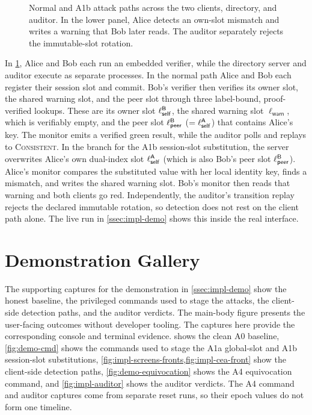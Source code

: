 \begin{figure}[p]
\centering

\caption[Normal and A1b attack paths across the four roles.]{Normal and A1b attack paths across
the two clients, directory, and auditor. In the lower panel, Alice detects an own-slot mismatch and
writes a warning that Bob later reads. The auditor separately rejects the immutable-slot rotation.}
\label{fig:impl-e2e}
\end{figure}

\FloatBarrier
In \cref{fig:impl-e2e}, Alice and Bob each run an embedded verifier, while the directory server and auditor
execute as separate processes. In the normal path Alice and Bob each register their session slot and
commit. Bob's verifier
then verifies its owner slot, the shared warning slot, and the peer slot through three
label-bound, proof-verified lookups. These are its owner slot $\ell^{\mathsf{B}}_{\mathsf{self}}$, the shared warning slot $\ell_{\mathsf{warn}}$, which is verifiably
empty, and the peer slot $\ell^{\mathsf{B}}_{\mathsf{peer}}$ ($=\ell^{\mathsf{A}}_{\mathsf{self}}$) that
contains Alice's key. The monitor emits a verified green result, while the auditor polls and replays to
\textsc{Consistent}. In the
branch for the A1b session-slot substitution, the server overwrites Alice's own dual-index slot $\ell^{\mathsf{A}}_{\mathsf{self}}$ (which is also Bob's peer slot $\ell^{\mathsf{B}}_{\mathsf{peer}}$).
Alice's monitor compares the substituted value with her local identity key, finds a mismatch, and
writes the shared warning slot. Bob's monitor then reads that warning and both clients go red. Independently, the
auditor's transition replay rejects the declared immutable rotation, so detection does not rest on the
client path alone. The live run in \cref{ssec:impl-demo} shows this inside the real interface.

\FloatBarrier
\section{Demonstration Gallery}\label{sec:apiref-demo}

The supporting captures for the demonstration in \cref{ssec:impl-demo} show the honest baseline,
the privileged commands used to stage the attacks, the client-side detection paths, and the auditor
verdicts. The main-body figure presents the user-facing outcomes without developer tooling. The
captures here provide the corresponding console and terminal evidence. 
shows the clean A0 baseline, \cref{fig:demo-cmd} shows the commands used to stage the A1a global-slot and A1b session-slot substitutions,
\cref{fig:impl-screens-fronts,fig:impl-cea-front} show the client-side detection paths,
\cref{fig:demo-equivocation} shows the A4 equivocation command, and \cref{fig:impl-auditor} shows the auditor
verdicts. The A4 command and auditor captures come from separate reset runs, so their epoch values
do not form one timeline.

